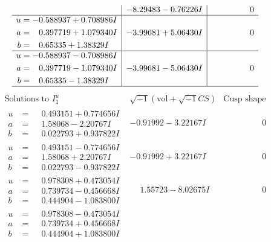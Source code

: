 \documentclass[1p]{elsarticle_modified}
\theoremstyle{definition}
\newcommand{\I}{\sqrt{-1}}
\begin{document}
$$\begin{array}{c|c|c}
 & -8.29483 - 0.76226 I & \phantom{-0.000000 } 0 \\ \hline\begin{aligned}
u &= -0.588937 + 0.708986 I \\
a &= \phantom{-}0.397719 + 1.079340 I \\
b &= \phantom{-}0.65335 + 1.38329 I\end{aligned}
 & -3.99681 + 5.06430 I & \phantom{-0.000000 } 0 \\ \hline\begin{aligned}
u &= -0.588937 - 0.708986 I \\
a &= \phantom{-}0.397719 - 1.079340 I \\
b &= \phantom{-}0.65335 - 1.38329 I\end{aligned}
 & -3.99681 - 5.06430 I & \phantom{-0.000000 } 0\\
 \hline 
 \end{array}$$\newpage$$\begin{array}{c|c|c}  
\text{Solutions to }I^u_{1}& \I (\text{vol} + \sqrt{-1}CS) & \text{Cusp shape}\\
 \hline 
\begin{aligned}
u &= \phantom{-}0.493151 + 0.774656 I \\
a &= \phantom{-}1.58068 - 2.20767 I \\
b &= \phantom{-}0.022793 + 0.937822 I\end{aligned}
 & -0.91992 - 3.22167 I & \phantom{-0.000000 } 0 \\ \hline\begin{aligned}
u &= \phantom{-}0.493151 - 0.774656 I \\
a &= \phantom{-}1.58068 + 2.20767 I \\
b &= \phantom{-}0.022793 - 0.937822 I\end{aligned}
 & -0.91992 + 3.22167 I & \phantom{-0.000000 } 0 \\ \hline\begin{aligned}
u &= \phantom{-}0.978308 + 0.473054 I \\
a &= \phantom{-}0.739734 - 0.456668 I \\
b &= \phantom{-}0.444904 - 1.083800 I\end{aligned}
 & \phantom{-}1.55723 - 8.02675 I & \phantom{-0.000000 } 0 \\ \hline\begin{aligned}
u &= \phantom{-}0.978308 - 0.473054 I \\
a &= \phantom{-}0.739734 + 0.456668 I \\
b &= \phantom{-}0.444904 + 1.083800 I\end{aligned}

\end{array}$$
\end{document}
